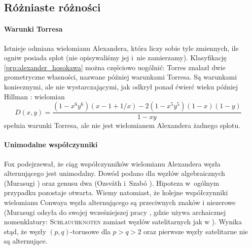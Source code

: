 
\subsection{Różniaste różności}
\paragraph{Warunki Torresa}
Istnieje odmiana wielomianu Alexandera, która liczy sobie tyle zmiennych, ile ogniw posiada splot (nie opisywaliśmy jej i~nie zamierzamy).
Klasyfikację \ref{prp:alexander_hosokawa} można częściowo uogólnić: Torres \cite{torres1953} znalazł dwie geometryczne własności, nazwane później warunkami Torresa.
%
%
Są warunkami koniecznymi, ale nie wystarczającymi, jak odkrył ponad ćwierć wieku później Hillman \cite{hillman1981}: wielomian
%
\begin{equation}
    D(x,y) = \frac{(1 - x^6y^6)(x - 1 + 1/x) - 2(1 - x^5y^5)(1 - x)(1 - y)}{1-xy}
\end{equation}
spełnia warunki Torresa, ale nie jest wielomianem Alexandera żadnego splotu.

\paragraph{Unimodalne współczynniki}
Fox \cite{fox1962} podejrzewał, że
%
%
ciąg współczynników wielomianu Alexandera węzła alternującego jest unimodalny.
Dowód podano dla węzłów algebraicznych (Murasugi \cite{murasugi1985}) oraz genusu dwa (Ozsváth i~Szabó \cite{ozsvath2003}).
%
%
%
Hipoteza w~ogólnym przypadku pozostaje otwarta.
Wiemy natomiast, że kolejne współczynniki wielomianu Conwaya węzła alternującego są przeciwnych znaków i niezerowe (Murasugi \cite[s. 242]{murasugi1996} odsyła do swojej wcześniejszej pracy \cite{murasugi1959}, gdzie używa archaicznej nomenklatury: \textsc{Schlauchknoten} zamiast węzłów satelitarnych jak w \cite[s. 245]{schubert1953}).
%
Wynika stąd, że węzły $(p, q)$-torusowe dla $p > q > 2$ oraz pierwsze węzły satelitarne nie są alternujące.


